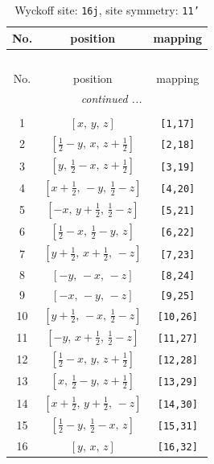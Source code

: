 \documentclass[fleqn,8pt]{jsarticle}
\begin{document}
\begin{longtable}{ccc}
\caption{Wyckoff site: {\tt 16j}, site symmetry: {\tt 11'}}
 \\
 \hline \hline
No. & position & mapping \\ \hline \endfirsthead

\multicolumn{2}{l}{\tablename\ \thetable{}} \\
 \hline \hline
No. & position & mapping \\ \hline \endhead

 \hline \hline
\multicolumn{2}{r}{\footnotesize\it continued ...} \\ \endfoot

 \hline \hline
\multicolumn{2}{r}{} \\ \endlastfoot

1 & $\left[ x,\, y,\, z \right]$ & {\tt [1,17]} \\ \hline
2 & $\left[ \frac{1}{2} - y,\, x,\, z + \frac{1}{2} \right]$ & {\tt [2,18]} \\ \hline
3 & $\left[ y,\, \frac{1}{2} - x,\, z + \frac{1}{2} \right]$ & {\tt [3,19]} \\ \hline
4 & $\left[ x + \frac{1}{2},\, - y,\, \frac{1}{2} - z \right]$ & {\tt [4,20]} \\ \hline
5 & $\left[ - x,\, y + \frac{1}{2},\, \frac{1}{2} - z \right]$ & {\tt [5,21]} \\ \hline
6 & $\left[ \frac{1}{2} - x,\, \frac{1}{2} - y,\, z \right]$ & {\tt [6,22]} \\ \hline
7 & $\left[ y + \frac{1}{2},\, x + \frac{1}{2},\, - z \right]$ & {\tt [7,23]} \\ \hline
8 & $\left[ - y,\, - x,\, - z \right]$ & {\tt [8,24]} \\ \hline
9 & $\left[ - x,\, - y,\, - z \right]$ & {\tt [9,25]} \\ \hline
10 & $\left[ y + \frac{1}{2},\, - x,\, \frac{1}{2} - z \right]$ & {\tt [10,26]} \\ \hline
11 & $\left[ - y,\, x + \frac{1}{2},\, \frac{1}{2} - z \right]$ & {\tt [11,27]} \\ \hline
12 & $\left[ \frac{1}{2} - x,\, y,\, z + \frac{1}{2} \right]$ & {\tt [12,28]} \\ \hline
13 & $\left[ x,\, \frac{1}{2} - y,\, z + \frac{1}{2} \right]$ & {\tt [13,29]} \\ \hline
14 & $\left[ x + \frac{1}{2},\, y + \frac{1}{2},\, - z \right]$ & {\tt [14,30]} \\ \hline
15 & $\left[ \frac{1}{2} - y,\, \frac{1}{2} - x,\, z \right]$ & {\tt [15,31]} \\ \hline
16 & $\left[ y,\, x,\, z \right]$ & {\tt [16,32]} \\
\end{longtable}
\end{document}
